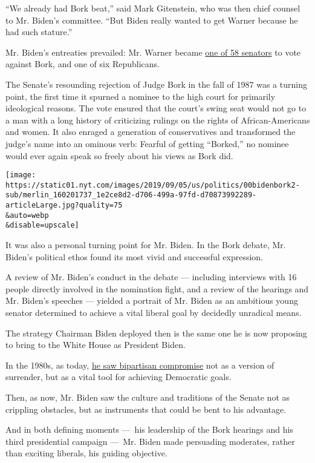 ``We already had Bork beat,'' said Mark Gitenstein, who was then chief
counsel to Mr. Biden's committee. ``But Biden really wanted to get
Warner because he had such stature.''

Mr. Biden's entreaties prevailed: Mr. Warner became
\href{https://www.nytimes.com/1987/10/24/politics/borks-nomination-is-rejected-5842-reagan-saddened.html}{one
of 58 senators} to vote against Bork, and one of six Republicans.

The Senate's resounding rejection of Judge Bork in the fall of 1987 was
a turning point, the first time it spurned a nominee to the high court
for primarily ideological reasons. The vote ensured that the court's
swing seat would not go to a man with a long history of criticizing
rulings on the rights of African-Americans and women. It also enraged a
generation of conservatives and transformed the judge's name into an
ominous verb: Fearful of getting ``Borked,'' no nominee would ever again
speak so freely about his views as Bork did.

\texttt{[image: https://static01.nyt.com/images/2019/09/05/us/politics/00bidenbork2-sub/merlin\_160201737\_1e2ce8d2-d706-499a-97fd-d70873992289-articleLarge.jpg?quality=75\\\&auto=webp\\\&disable=upscale]}

It was also a personal turning point for Mr. Biden. In the Bork debate,
Mr. Biden's political ethos found its most vivid and successful
expression.

A review of Mr. Biden's conduct in the debate --- including interviews
with 16 people directly involved in the nomination fight, and a review
of the hearings and Mr. Biden's speeches --- yielded a portrait of Mr.
Biden as an ambitious young senator determined to achieve a vital
liberal goal by decidedly unradical means.

The strategy Chairman Biden deployed then is the same one he is now
proposing to bring to the White House as President Biden.

In the 1980s, as today,
\href{https://www.nytimes.com/2019/06/21/us/politics/biden-democrats-race.html}{he
saw bipartisan compromise} not as a version of surrender, but as a vital
tool for achieving Democratic goals.

Then, as now, Mr. Biden saw the culture and traditions of the Senate not
as crippling obstacles, but as instruments that could be bent to his
advantage.

And in both defining moments ---~his leadership of the Bork hearings and
his third presidential campaign ---~Mr. Biden made persuading moderates,
rather than exciting liberals, his guiding objective.

